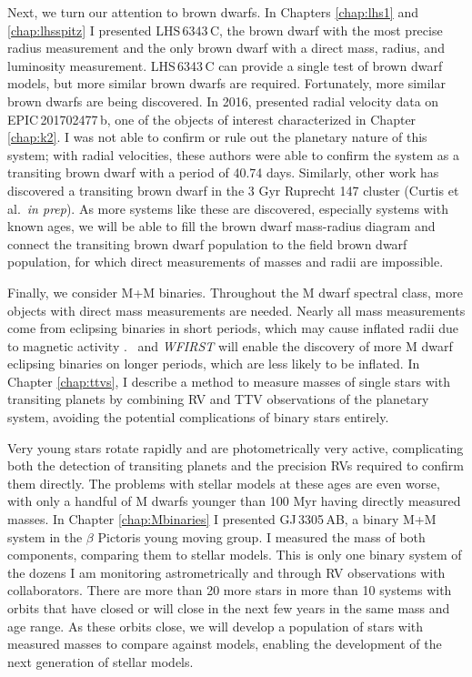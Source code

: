 Next, we turn our attention to brown dwarfs.
In Chapters \ref{chap:lhs1} and \ref{chap:lhsspitz} I presented LHS\,6343\,C, the
brown dwarf with the most precise radius measurement and the only brown dwarf with a
direct mass, radius, and luminosity measurement.
LHS\,6343\,C can provide a single test of brown dwarf models, but more similar
brown dwarfs are required.
Fortunately, more similar brown dwarfs are being discovered. 
In 2016, \citet{Bayliss16} presented radial velocity data on EPIC\,201702477\,b,
one of the objects of interest characterized in Chapter \ref{chap:k2}. 
I was not able to confirm or rule out the planetary nature of this system;
with radial velocities, these authors were able to confirm the system as a transiting
brown dwarf with a period of 40.74 days.
Similarly, other work has discovered a transiting brown dwarf in the 3 Gyr Ruprecht 147
cluster (Curtis et al.\ \textit{in prep}). 
As more systems like these are discovered, especially systems with known ages, 
we will be able to fill the brown dwarf mass-radius diagram and connect the transiting
brown dwarf population to the field brown dwarf population, for which direct measurements
of masses and radii are impossible.


Finally, we consider M+M binaries. 
Throughout the M dwarf spectral class, more objects with direct mass measurements are
needed.
Nearly all mass measurements come from eclipsing binaries in short periods, which may
cause inflated radii due to magnetic activity \citep{Chabrier07, Jackson09}.
\KT\ and \textit{WFIRST} will enable the discovery of more M dwarf eclipsing binaries 
on longer periods, which are less likely to be inflated.
In Chapter \ref{chap:ttvs}, I describe a method to measure masses of single stars
with transiting planets by combining RV and TTV observations of the planetary system,
avoiding the potential complications of binary stars entirely.

Very young stars rotate rapidly and are photometrically very active, complicating both
the detection of transiting planets and the precision RVs required to confirm them 
directly.
The problems with stellar models at these ages are even worse, with only a handful of
M dwarfs younger than 100 Myr having directly measured masses.
In Chapter \ref{chap:Mbinaries} I presented GJ\,3305\,AB, a binary M+M system in the
$\beta$ Pictoris young moving group. 
I measured the mass of both components, comparing them to stellar models.
This is only one binary system of the dozens I am monitoring astrometrically and through
RV observations with collaborators. There are more than 20 more stars in more than 
10 systems with orbits that have closed or will close in the next few years in the same
mass and age range.
As these orbits close, we will develop a population of stars with measured masses to
compare against models, enabling the development of the next generation of stellar models.

